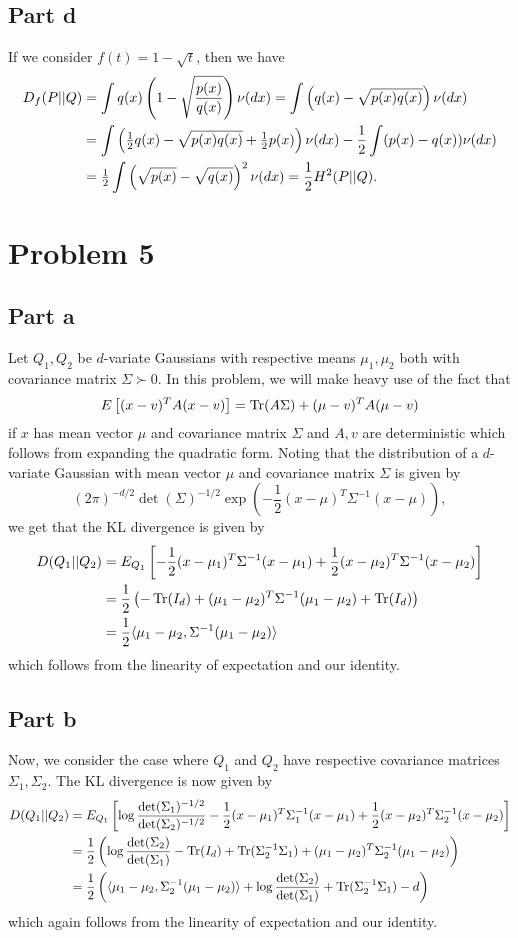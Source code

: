 \documentclass{article}
\begin{document}
\subsection{Part d}
If we consider $f(t)=1-\sqrt{t}$, then we have 
\begin{align*}
D_f(P||Q)&=\int q(x)\left(1-\sqrt{\frac{p(x)}{q(x)}}\right)\nu (dx)=\int \left(q(x)-\sqrt{p(x)q(x)}\right)\nu (dx)\\&=
\int \left(\mbox{$\frac{1}{2}$} q(x)-\sqrt{p(x)q(x)}+\mbox{$\frac{1}{2}$} p(x)\right)\nu(dx)-\frac{1}{2}\int(p(x)-q(x))\nu(dx)\\&=
\mbox{$\frac{1}{2}$}\int\left(\sqrt{p(x)}-\sqrt{q(x)}\right)^2\nu(dx)=\frac{1}{2}H^2(P||Q).
\end{align*} 

\section{Problem 5}
\subsection{Part a}
Let $Q_1,Q_2$ be $d$-variate Gaussians with respective means $\mu_1,\mu_2$ both with covariance matrix $\Sigma\succ0$. In this problem, we will make heavy use of the fact that 
\[
E\left[(x-v)^TA(x-v)\right]=\operatorname{Tr}(A\Sigma)+(\mu-v)^TA(\mu-v)
\]
if $x$ has mean vector $\mu$ and covariance matrix $\Sigma$ and $A,v$ are deterministic which follows from expanding the quadratic form. Noting that the distribution of a $d$-variate Gaussian with mean vector $\mu$ and covariance matrix $\Sigma$ is given by
\[
(2\pi)^{-d/2}\det(\Sigma)^{-1/2}\exp\left(-\frac{1}{2}(x-\mu)^T\Sigma^{-1}(x-\mu)\right),
\]
we get that the KL divergence is given by
\begin{align*}
D(Q_1||Q_2)&=E_{Q_1}\left[-\frac{1}{2}(x-\mu_1)^T\Sigma^{-1}(x-\mu_1)+\frac{1}{2}(x-\mu_2)^T\Sigma^{-1}(x-\mu_2)\right]\\&=
\frac{1}{2}\left(-\operatorname{Tr}(I_d)+(\mu_1-\mu_2)^T\Sigma^{-1}(\mu_1-\mu_2)+\operatorname{Tr}(I_d)\right)\\&=
\frac{1}{2}\langle \mu_1-\mu_2,\Sigma^{-1}(\mu_1-\mu_2)\rangle
\end{align*}
which follows from the linearity of expectation and our identity.
\subsection{Part b}
Now, we consider the case where $Q_1$ and $Q_2$ have respective covariance matrices $\Sigma_1,\Sigma_2$. The KL divergence is now given by
\begin{align*}
D(Q_1||Q_2)&=E_{Q_1}\left[\log\frac{\det(\Sigma_1)^{-1/2}}{\det(\Sigma_2)^{-1/2}}-\frac{1}{2}(x-\mu_1)^T\Sigma_1^{-1}(x-\mu_1)+\frac{1}{2}(x-\mu_2)^T\Sigma_2^{-1}(x-\mu_2)\right]\\&=
\frac{1}{2}\left(\log\frac{\det(\Sigma_2)}{\det(\Sigma_1)}-\operatorname{Tr}(I_d)+\operatorname{Tr}(\Sigma_2^{-1}\Sigma_1)+(\mu_1-\mu_2)^T\Sigma_2^{-1}(\mu_1-\mu_2)\right)\\&=
\frac{1}{2}\left(\langle \mu_1-\mu_2,\Sigma_2^{-1}(\mu_1-\mu_2)\rangle+\log\frac{\det(\Sigma_2)}{\det(\Sigma_1)}+\operatorname{Tr}(\Sigma_2^{-1}\Sigma_1)-d\right)
\end{align*}
which again follows from the linearity of expectation and our identity.
\end{document}
